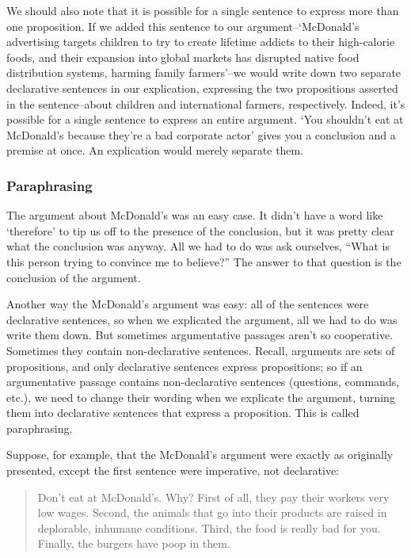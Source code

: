 We should also note that it is possible for a single sentence to express more than one proposition.
If we added this sentence to our argument--`McDonald's advertising targets children to try to
create lifetime addicts to their high-calorie foods, and their expansion into global markets has
disrupted native food distribution systems, harming family farmers'--we would write down two
separate declarative sentences in our explication, expressing the two propositions asserted in the
sentence--about children and international farmers, respectively. Indeed, it's possible for a single
sentence to express an entire argument. `You shouldn't eat at McDonald's because they're a bad
corporate actor' gives you a conclusion and a premise at once. An explication would merely
separate them.

\subsubsection{Paraphrasing}
The argument about McDonald's was an easy case. It didn't have a word like `therefore' to tip us
off to the presence of the conclusion, but it was pretty clear what the conclusion was anyway. All
we had to do was ask ourselves, ``What is this person trying to convince me to believe?'' The
answer to that question is the conclusion of the argument.

Another way the McDonald's argument was easy: all of the sentences were declarative sentences,
so when we explicated the argument, all we had to do was write them down. But sometimes
argumentative passages aren't so cooperative. Sometimes they contain non-declarative sentences.
Recall, arguments are sets of propositions, and only declarative sentences express propositions; so
if an argumentative passage contains non-declarative sentences (questions, commands, etc.), we
need to change their wording when we explicate the argument, turning them into declarative
sentences that express a proposition. This is called paraphrasing.

Suppose, for example, that the McDonald's argument were exactly as originally presented, except
the first sentence were imperative, not declarative:

\begin{quotation}
Don't eat at McDonald's. Why? First of all, they pay their workers very low wages.
Second, the animals that go into their products are raised in deplorable, inhumane
conditions. Third, the food is really bad for you. Finally, the burgers have poop in them.
\end{quotation}

